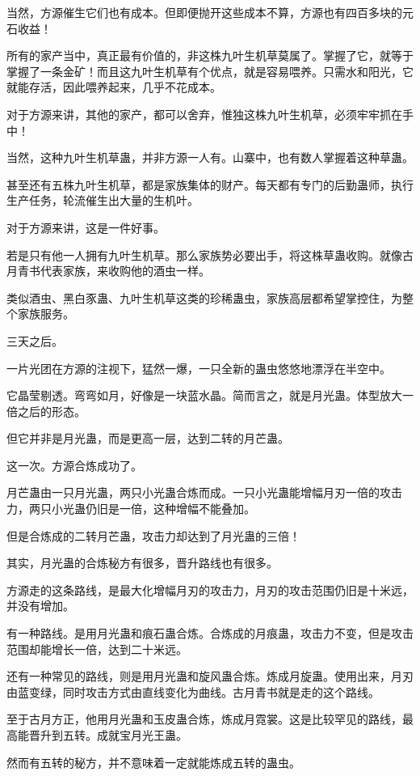 \begin{this_body}
当然，方源催生它们也有成本。但即便抛开这些成本不算，方源也有四百多块的元石收益！

所有的家产当中，真正最有价值的，非这株九叶生机草莫属了。掌握了它，就等于掌握了一条金矿！而且这九叶生机草有个优点，就是容易喂养。只需水和阳光，它就能存活，因此喂养起来，几乎不花成本。

对于方源来讲，其他的家产，都可以舍弃，惟独这株九叶生机草，必须牢牢抓在手中！

当然，这种九叶生机草蛊，并非方源一人有。山寨中，也有数人掌握着这种草蛊。

甚至还有五株九叶生机草，都是家族集体的财产。每天都有专门的后勤蛊师，执行生产任务，轮流催生出大量的生机叶。

对于方源来讲，这是一件好事。

若是只有他一人拥有九叶生机草。那么家族势必要出手，将这株草蛊收购。就像古月青书代表家族，来收购他的酒虫一样。

类似酒虫、黑白豕蛊、九叶生机草这类的珍稀蛊虫，家族高层都希望掌控住，为整个家族服务。

三天之后。

一片光团在方源的注视下，猛然一爆，一只全新的蛊虫悠悠地漂浮在半空中。

它晶莹剔透。弯弯如月，好像是一块蓝水晶。简而言之，就是月光蛊。体型放大一倍之后的形态。

但它并非是月光蛊，而是更高一层，达到二转的月芒蛊。

这一次。方源合炼成功了。

月芒蛊由一只月光蛊，两只小光蛊合炼而成。一只小光蛊能增幅月刃一倍的攻击力，两只小光蛊仍旧是一倍，这种增幅不能叠加。

但是合炼成的二转月芒蛊，攻击力却达到了月光蛊的三倍！

其实，月光蛊的合炼秘方有很多，晋升路线也有很多。

方源走的这条路线，是最大化增幅月刃的攻击力，月刃的攻击范围仍旧是十米远，并没有增加。

有一种路线。是用月光蛊和痕石蛊合炼。合炼成的月痕蛊，攻击力不变，但是攻击范围却能增长一倍，达到二十米远。

还有一种常见的路线，则是用月光蛊和旋风蛊合炼。炼成月旋蛊。使用出来，月刃由蓝变绿，同时攻击方式由直线变化为曲线。古月青书就是走的这个路线。

至于古月方正，他用月光蛊和玉皮蛊合炼，炼成月霓裳。这是比较罕见的路线，最高能晋升到五转。成就宝月光王蛊。

然而有五转的秘方，并不意味着一定就能炼成五转的蛊虫。


\end{this_body}
